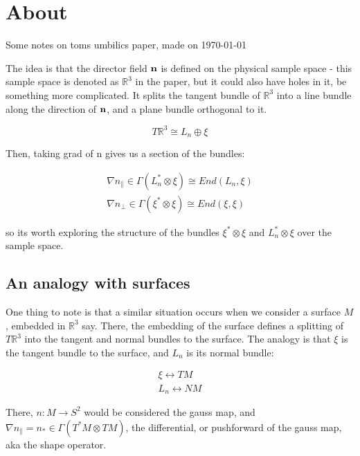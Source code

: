 \documentclass[11pt,onecolumn, a4page]{article}
\numberwithin{equation}{subsection}
\begin{document}

\section{About}

Some notes on toms umbilics paper, made on {\today}

The idea is that the director field $\bf{n}$ is defined on the physical sample space - this sample space is denoted as $\mathbb{R}^3$ in the paper, but it could also have holes in it, be something more complicated. It splits the tangent bundle of $\mathbb{R}^3$ into a line bundle along the direction of $\bf{n}$, and a plane bundle orthogonal to it.

\begin{equation}
T\mathbb{R}^3 \cong L_{n} \oplus \xi
\end{equation}

Then, taking grad of n gives us a section of the bundles:

\begin{eqnarray}
\nabla n_{\parallel} \in \Gamma (L_{n}^{*} \otimes \xi) \cong End(L_{n}, \xi) \\
\nabla n_{\bot} \in \Gamma (\xi^{*} \otimes \xi) \cong End(\xi, \xi)
\end{eqnarray}

so its worth exploring the structure of the bundles $\xi^{*} \otimes \xi$ and $L_{n}^{*} \otimes \xi$ over the sample space. \par

\subsection{An analogy with surfaces}

One thing to note is that a similar situation occurs when we consider a surface $M$, embedded in $\mathbb{R}^3$ say. There, the embedding of the surface defines a splitting of $T\mathbb{R}^3$ into the tangent and normal bundles to the surface. The analogy is that $\xi$ is the tangent bundle to the surface, and $L_{n}$ is its normal bundle:

\begin{eqnarray}
 \xi \leftrightarrow TM \\
 L_{n} \leftrightarrow NM
\end{eqnarray}

There, $n : M \rightarrow S^{2}$ would be considered the gauss map, and   $\nabla n_{\parallel} = n_{*} \in \Gamma (T^{*}M \otimes TM)$, the differential, or pushforward of the gauss map, aka the shape operator.
\end{document}
